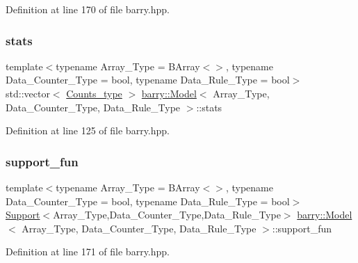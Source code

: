 Definition at line 170 of file barry.\+hpp.

\mbox{\label{classbarry_1_1_model_a09fa1641ee40f23bad698a7c78db4b87}} 
\subsubsection{\texorpdfstring{stats}{stats}}
{\footnotesize\ttfamily template$<$typename Array\+\_\+\+Type  = B\+Array$<$$>$, typename Data\+\_\+\+Counter\+\_\+\+Type  = bool, typename Data\+\_\+\+Rule\+\_\+\+Type  = bool$>$ \\
std\+::vector$<$ \hyperlink{namespacebarry_a3e2d8c3b6cf602107559d4237d9f1315}{Counts\+\_\+type} $>$ \hyperlink{classbarry_1_1_model}{barry\+::\+Model}$<$ Array\+\_\+\+Type, Data\+\_\+\+Counter\+\_\+\+Type, Data\+\_\+\+Rule\+\_\+\+Type $>$\+::stats}



Definition at line 125 of file barry.\+hpp.

\mbox{\label{classbarry_1_1_model_afd005aae0fdd12a8c68d1fd8823b3727}} 
\subsubsection{\texorpdfstring{support\+\_\+fun}{support\_fun}}
{\footnotesize\ttfamily template$<$typename Array\+\_\+\+Type  = B\+Array$<$$>$, typename Data\+\_\+\+Counter\+\_\+\+Type  = bool, typename Data\+\_\+\+Rule\+\_\+\+Type  = bool$>$ \\
\hyperlink{classbarry_1_1_support}{Support}$<$Array\+\_\+\+Type,Data\+\_\+\+Counter\+\_\+\+Type,Data\+\_\+\+Rule\+\_\+\+Type$>$ \hyperlink{classbarry_1_1_model}{barry\+::\+Model}$<$ Array\+\_\+\+Type, Data\+\_\+\+Counter\+\_\+\+Type, Data\+\_\+\+Rule\+\_\+\+Type $>$\+::support\+\_\+fun}



Definition at line 171 of file barry.\+hpp.

\mbox{\label{classbarry_1_1_model_ab2a0fde37b6a6da5a5faffcd24ec4c27}} 
